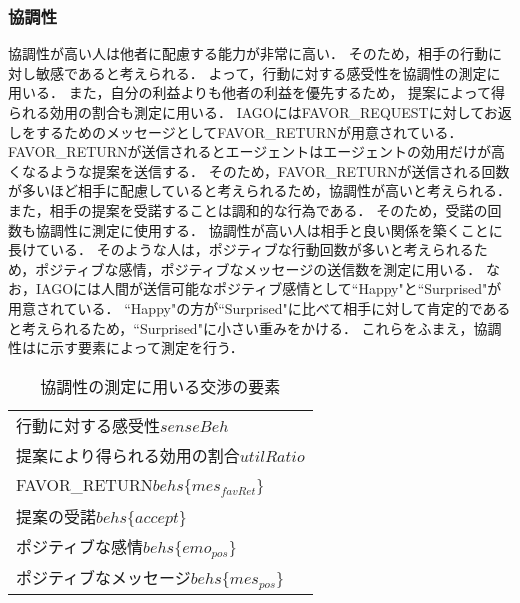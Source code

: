 \subsubsection*{協調性}
協調性が高い人は他者に配慮する能力が非常に高い．
そのため，相手の行動に対し敏感であると考えられる．
よって，行動に対する感受性を協調性の測定に用いる．
また，自分の利益よりも他者の利益を優先するため，
提案によって得られる効用の割合も測定に用いる．
IAGOにはFAVOR\_REQUESTに対してお返しをするためのメッセージとしてFAVOR\_RETURNが用意されている．
FAVOR\_RETURNが送信されるとエージェントはエージェントの効用だけが高くなるような提案を送信する．
そのため，FAVOR\_RETURNが送信される回数が多いほど相手に配慮していると考えられるため，協調性が高いと考えられる．
また，相手の提案を受諾することは調和的な行為である．
そのため，受諾の回数も協調性に測定に使用する．
協調性が高い人は相手と良い関係を築くことに長けている．
そのような人は，ポジティブな行動回数が多いと考えられるため，ポジティブな感情，ポジティブなメッセージの送信数を測定に用いる．
なお，IAGOには人間が送信可能なポジティブ感情として``Happy"と``Surprised"が用意されている．
``Happy"の方が``Surprised"に比べて相手に対して肯定的であると考えられるため，``Surprised"に小さい重みをかける．
これらをふまえ，協調性はに示す要素によって測定を行う．

\begin{table}[bt]
    \centering
    \caption{協調性の測定に用いる交渉の要素}
    \begin{tabular}{l} \toprule
        行動に対する感受性$senseBeh$ \\
        提案により得られる効用の割合$utilRatio$  \\
        FAVOR\_RETURN$behs\{mes_{\mathit{favRet}}\}$ \\
        提案の受諾$behs\{accept\}$ \\ 
        ポジティブな感情$behs\{emo_{pos}\}$ \\
        ポジティブなメッセージ$behs\{mes_{pos}\}$ \\ \bottomrule
    \end{tabular}
    \label{tab:agreeableness}
\end{table}

